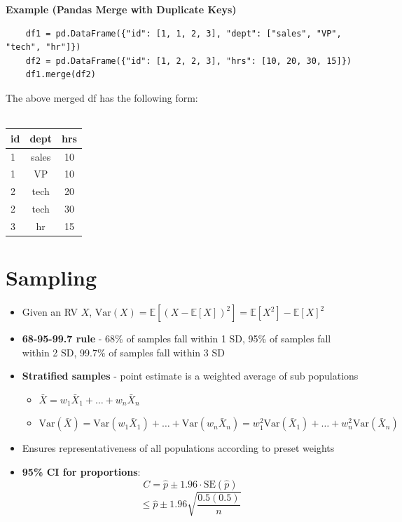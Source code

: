 \documentclass{article}
\begin{document}
\noindent\textbf{Example (Pandas Merge with Duplicate Keys)}
\begin{verbatim}
    df1 = pd.DataFrame({"id": [1, 1, 2, 3], "dept": ["sales", "VP", "tech", "hr"]})
    df2 = pd.DataFrame({"id": [1, 2, 2, 3], "hrs": [10, 20, 30, 15]})
    df1.merge(df2)
\end{verbatim}

The above merged df has the following form: \\
\\
\begin{tabular}{lcc}
\hline
id & dept & hrs \\
\hline
1 & sales & 10 \\
1 & VP & 10 \\
2 & tech & 20 \\
2 & tech & 30 \\
3 & hr & 15 \\
\hline
\end{tabular}

\section{Sampling}
\begin{itemize}
    \item Given an RV $X$, $\text{Var}(X) = \mathbb{E}[(X - \mathbb{E}[X])^2] = \mathbb{E}[X^2] - \mathbb{E}[X]^2$
    \item \textbf{68-95-99.7 rule} - 68\% of samples fall within 1 SD, 95\% of samples fall within 2 SD, 99.7\% of samples fall within 3 SD
    \item \textbf{Stratified samples} - point estimate is a weighted average of sub populations
        \begin{itemize}
            \item $\bar{X} = w_1\bar{X}_1 + \ldots + w_n\bar{X}_n$
            \item $\text{Var}(\bar{X}) = \text{Var}(w_1\bar{X}_1) + \ldots + \text{Var}(w_n\bar{X}_n) = w_1^2\text{Var}(\bar{X}_1) + \ldots + w_n^2\text{Var}(\bar{X}_n)$
        \end{itemize}
    \item Ensures representativeness of all populations according to preset weights
    \item \textbf{95\% CI for proportions}:
        \[
            C = \hat{p} \pm 1.96 \cdot \text{SE}(\hat{p})
        \]
        \[
            \leq \hat{p} \pm 1.96\sqrt{\frac{0.5(0.5)}{n}}
        \]
\end{itemize}
\end{document}
